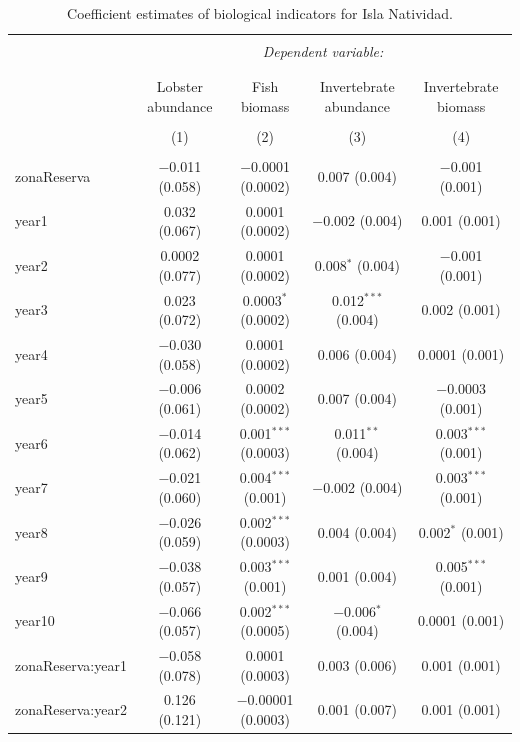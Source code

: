 \documentclass[]{article}
\begin{document}
\begin{table}[!htbp] \centering 
  \caption{Coefficient estimates of biological indicators for Isla Natividad.} 
  \label{} 
\tiny 
\begin{tabular}{@{\extracolsep{1pt}}lcccc} 
\\[-1.8ex]\hline 
\hline \\[-1.8ex] 
 & \multicolumn{4}{c}{\textit{Dependent variable:}} \\ 
\cline{2-5} 
\\[-1.8ex] & \multicolumn{4}{c}{} \\ 
 & Lobster abundance & Fish biomass & Invertebrate abundance & Invertebrate biomass \\ 
\\[-1.8ex] & (1) & (2) & (3) & (4)\\ 
\hline \\[-1.8ex] 
 zonaReserva & $-$0.011 (0.058) & $-$0.0001 (0.0002) & 0.007 (0.004) & $-$0.001 (0.001) \\ 
  year1 & 0.032 (0.067) & 0.0001 (0.0002) & $-$0.002 (0.004) & 0.001 (0.001) \\ 
  year2 & 0.0002 (0.077) & 0.0001 (0.0002) & 0.008$^{*}$ (0.004) & $-$0.001 (0.001) \\ 
  year3 & 0.023 (0.072) & 0.0003$^{*}$ (0.0002) & 0.012$^{***}$ (0.004) & 0.002 (0.001) \\ 
  year4 & $-$0.030 (0.058) & 0.0001 (0.0002) & 0.006 (0.004) & 0.0001 (0.001) \\ 
  year5 & $-$0.006 (0.061) & 0.0002 (0.0002) & 0.007 (0.004) & $-$0.0003 (0.001) \\ 
  year6 & $-$0.014 (0.062) & 0.001$^{***}$ (0.0003) & 0.011$^{**}$ (0.004) & 0.003$^{***}$ (0.001) \\ 
  year7 & $-$0.021 (0.060) & 0.004$^{***}$ (0.001) & $-$0.002 (0.004) & 0.003$^{***}$ (0.001) \\ 
  year8 & $-$0.026 (0.059) & 0.002$^{***}$ (0.0003) & 0.004 (0.004) & 0.002$^{*}$ (0.001) \\ 
  year9 & $-$0.038 (0.057) & 0.003$^{***}$ (0.001) & 0.001 (0.004) & 0.005$^{***}$ (0.001) \\ 
  year10 & $-$0.066 (0.057) & 0.002$^{***}$ (0.0005) & $-$0.006$^{*}$ (0.004) & 0.0001 (0.001) \\ 
  zonaReserva:year1 & $-$0.058 (0.078) & 0.0001 (0.0003) & 0.003 (0.006) & 0.001 (0.001) \\ 
  zonaReserva:year2 & 0.126 (0.121) & $-$0.00001 (0.0003) & 0.001 (0.007) & 0.001 (0.001) \\ 

\end{tabular}
\end{table}
\end{document}
